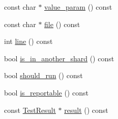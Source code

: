 \begin{DoxyCompactItemize}
\item 
const char $\ast$ \mbox{\hyperlink{classtesting_1_1_test_info_abdf2c6cfcf4819e725816c64e1c1fc24}{value\+\_\+param}} () const
\item 
const char $\ast$ \mbox{\hyperlink{classtesting_1_1_test_info_a9b74d79cf618ce5bb0d0b1da75ee8b35}{file}} () const
\item 
int \mbox{\hyperlink{classtesting_1_1_test_info_af5931cfc594b5d660c56b3c61c41ea13}{line}} () const
\item 
bool \mbox{\hyperlink{classtesting_1_1_test_info_a8621f2cf7623fd1609db8e324f0c2fec}{is\+\_\+in\+\_\+another\+\_\+shard}} () const
\item 
bool \mbox{\hyperlink{classtesting_1_1_test_info_a866e33b5bc5ab2a6e5375fc7d3af0f96}{should\+\_\+run}} () const
\item 
bool \mbox{\hyperlink{classtesting_1_1_test_info_a63e7042028b0b846f4b5a1e5bcffc079}{is\+\_\+reportable}} () const
\item 
const \mbox{\hyperlink{classtesting_1_1_test_result}{Test\+Result}} $\ast$ \mbox{\hyperlink{classtesting_1_1_test_info_aee8cb884c95cd446129aba936b4159e0}{result}} () const
\end{DoxyCompactItemize}
